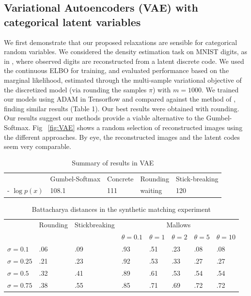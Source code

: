 \documentclass[twoside]{article}
\begin{document}
\subsection{Variational Autoencoders (VAE) with categorical latent variables}
We first demonstrate that our proposed relaxations are sensible for
categorical random variables. We considered the density estimation
task on MNIST digits, as in \cite{maddison2016concrete,
  jang2016categorical}, where observed digits are reconstructed from a
latent discrete code. We used the continuous ELBO for training, and
evaluated performance based on the marginal likelihood, estimated
through the multi-sample variational objective of the discretized
model (via rounding the samples $\pi$) with $m=1000$. We trained our
models using ADAM in Tensorflow and compared against the method of
\cite{jang2016categorical}, finding similar results (Table 1). Our
best results were obtained with rounding. Our results suggest our
methods provide a viable alternative to the Gumbel-Softmax. Fig
~\ref{fig:VAE} shows a random selection of reconstructed images using
the different approaches.  By eye, the reconstructed images
and the latent codes seem very comparable. 


\begin{table}[t]
  \caption{Summary of results in VAE}
  \label{sample-table}
  \centering
  \begin{tabular}{lllll}

 

    & Gumbel-Softmax    & Concrete  & Rounding & Stick-breaking\\
    \cmidrule{2-5}
    - $\log p(x)$ & 108.1  &111 & waiting   &120 \\
        \bottomrule
  \end{tabular}
\end{table}


\begin{table}[t]
  \caption{Battacharya distances in the synthetic matching experiment}
  \label{sample-table}
  \centering
  \begin{tabular}{llllllll}
   & \multicolumn{1}{c}{Rounding} & \multicolumn{1}{c}{Stickbreaking} & \multicolumn{5}{c}{Mallows}\\
    \cmidrule(lr){2-2} \cmidrule(lr){3-3} \cmidrule(lr){4-8}
    &    & &   $\theta=0.1$ &  $\theta=1$ & $\theta=2$ & $\theta=5$ & $\theta=10$ \\
    \midrule
    $\sigma=0.1$     & .06 & .09  &.93 &.51& .23  & .08 &.08\\
    $\sigma=0.25$     & .21 & .23 & .92 &.53 & .33&  .27 &.27\\
     $\sigma=0.5$     & .32 & .41 & .89 &.61 & .53&  .54& .54\\
     $\sigma=0.75$     & .38   & .55 & .85 &.71 & .69&  .72 &.72\\
   
    \bottomrule
  \end{tabular}
\end{table}
\end{document}
